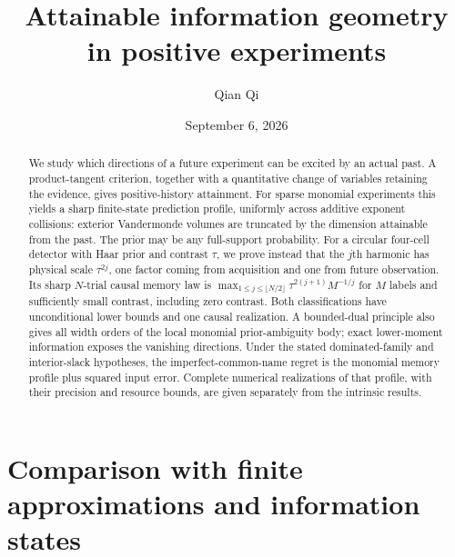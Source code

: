 \documentclass[11pt]{amsart}
\title[Attainable information geometry]{Attainable information geometry\\ in positive experiments}
\author{Qian Qi}
\date{September 6, 2026}
\theoremstyle{definition}\newtheorem{definition}[theorem]{Definition}
\theoremstyle{remark}\newtheorem{remark}[theorem]{Remark}
\begin{document}
\begin{abstract}
We study which directions of a future experiment can be excited by an
actual past. A product-tangent criterion, together with a quantitative
change of variables retaining the evidence, gives positive-history
attainment. For sparse monomial experiments this yields a sharp
finite-state prediction profile, uniformly across additive exponent
collisions: exterior Vandermonde volumes are truncated by the dimension
attainable from the past. The prior may be any full-support probability.
For a circular four-cell detector with Haar prior and contrast $\tau$,
we prove instead that the $j$th harmonic has physical scale $\tau^{2j}$,
one factor coming from acquisition and one from future observation.
Its sharp $N$-trial causal memory law is
$\max_{1\le j\le\lfloor N/2\rfloor}\tau^{2(j+1)}M^{-1/j}$
for $M$ labels and sufficiently small contrast, including zero contrast.
Both classifications have unconditional lower bounds and one causal
realization. A bounded-dual principle also gives all width orders of the
local monomial prior-ambiguity body; exact lower-moment information
exposes the vanishing directions. Under the stated dominated-family
and interior-slack hypotheses, the imperfect-common-name regret is the
monomial memory profile plus squared input error. Complete numerical
realizations of that profile, with their precision and resource bounds,
are given separately from the intrinsic results.
\end{abstract}
\maketitle












\appendix












\section{Comparison with finite approximations and information states}
\label{sec:literature-comparison}


\end{document}
